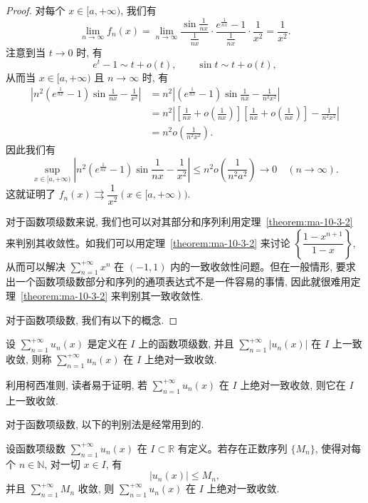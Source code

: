 \begin{proof}
对每个 $x\in[a,+\infty)$, 我们有
\[
  \lim_{n\to\infty}f_n(x)
  =\lim_{n\to\infty}\frac{\sin\frac1{nx}}{\frac1{nx}}\cdot
  \frac{e^{\frac1{nx}}-1}{\frac1{nx}}\cdot\frac1{x^2}
  =\frac1{x^2}.
\]
注意到当 $t\to0$ 时, 有
\[
  e^t-1\sim t+o(t),\qquad \sin t\sim t+o(t),
\]
从而当 $x\in[a,+\infty)$ 且 $n\to\infty$ 时, 有
\[
\begin{aligned}
  \left|n^2\left(e^{\frac1{nx}}-1\right)\sin\frac1{nx}-\frac1{x^2}\right|
  &=n^2\left|\left(e^{\frac1{nx}}-1\right)\sin\frac1{nx}-\frac1{n^2x^2}\right|\\
  &=n^2\left|\left[\frac1{nx}+o\left(\frac1{nx}\right)\right]
  \left[\frac1{nx}+o\left(\frac1{nx}\right)\right]-\frac1{n^2x^2}\right|\\
  &=n^2o\left(\frac1{n^2x^2}\right).
\end{aligned}
\]
因此我们有
\[
  \sup_{x\in[a,+\infty)}
  \left|n^2\left(e^{\frac1{nx}}-1\right)\sin\frac1{nx}-\frac1{x^2}\right|
  \leq n^2o\left(\frac1{n^2a^2}\right)\to0\quad(n\to\infty).
\]
这就证明了 $f_n(x)\rightrightarrows\dfrac1{x^2}(x\in[a,+\infty))$.

对于函数项级数来说, 我们也可以对其部分和序列利用定理~\ref{theorem:ma-10-3-2} 来判别其收敛性。如我们可以用定理~\ref{theorem:ma-10-3-2} 来讨论 $\left\{\dfrac{1-x^{n+1}}{1-x}\right\}$, 从而可以解决 $\sum\limits_{n=1}^{+\infty}x^n$ 在 $(-1,1)$ 内的一致收敛性问题。但在一般情形, 要求出一个函数项级数部分和序列的通项表达式不是一件容易的事情, 因此就很难用定理~\ref{theorem:ma-10-3-2} 来判别其一致收敛性.

对于函数项级数, 我们有以下的概念.
\end{proof}


\begin{definition}\label{definition:ma-10-3-1}
设 $\sum\limits_{n=1}^{+\infty}u_n(x)$ 是定义在 $I$ 上的函数项级数, 并且 $\sum\limits_{n=1}^{+\infty}|u_n(x)|$ 在 $I$ 上一致收敛, 则称 $\sum\limits_{n=1}^{+\infty}u_n(x)$ 在 $I$ 上绝对一致收敛.
\end{definition}

利用柯西准则, 读者易于证明, 若 $\sum\limits_{n=1}^{+\infty}u_n(x)$ 在 $I$ 上绝对一致收敛, 则它在 $I$ 上一致收敛.

对于函数项级数, 以下的判别法是经常用到的.

\begin{theorem}\label{theorem:ma-10-3-3}
设函数项级数 $\sum\limits_{n=1}^{+\infty}u_n(x)$ 在 $I\subset\mathbb R$ 有定义。若存在正数序列 $\{M_n\}$, 使得对每个 $n\in\mathbb N$, 对一切 $x\in I$, 有
\[
  |u_n(x)|\leq M_n,
\]
并且 $\sum\limits_{n=1}^{+\infty}M_n$ 收敛, 则 $\sum\limits_{n=1}^{+\infty}u_n(x)$ 在 $I$ 上绝对一致收敛.
\end{theorem}



